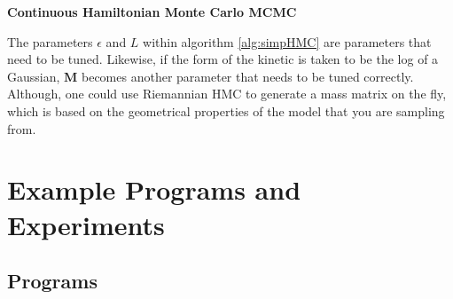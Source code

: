 \documentclass[twoside]{article}
\begin{document}
\begin{algorithm}
	\caption{\textbf{Continuous Hamiltonian Monte Carlo MCMC}}
	\begin{algorithmic}[1]
		\EndFor
		  
		\Else
		 
		\EndIf
		\EndFor
		\EndProcedure
	\end{algorithmic}
   \label{alg:simpHMC} 
\end{algorithm}

The parameters  $\epsilon$ and $L$ within algorithm \ref{alg:simpHMC} are parameters that need to be tuned. Likewise, if the form of the kinetic is taken to be the log of a Gaussian, $\textbf{M}$ becomes another parameter that needs to be tuned correctly. Although, one could use Riemannian HMC \citep{girolami2011riemann} to generate a mass matrix on the fly, which is based on the geometrical properties of the model that you are sampling from.

\section{Example Programs and Experiments}
\label{sec:exampprog}
\subsection{Programs}
\end{document}
